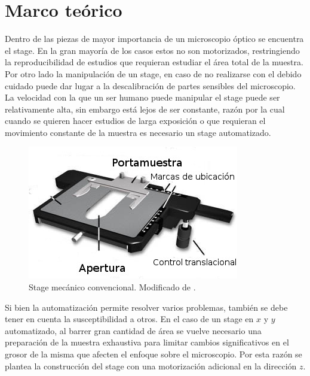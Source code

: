 \section{Marco teórico}
Dentro de las piezas de mayor importancia de un microscopio óptico se encuentra el stage. En la gran mayoría de los casos estos no son motorizados, restringiendo la reproducibilidad de estudios que requieran estudiar el área total de la muestra. Por otro lado la manipulación de un stage, en caso de no realizarse con el debido cuidado puede dar lugar a la descalibración de partes sensibles del microscopio. La velocidad con la que un ser humano puede manipular el stage puede ser relativamente alta, sin embargo está lejos de ser constante, razón por la cual cuando se quieren hacer estudios de larga exposición o que requieran el movimiento constante de la muestra es necesario un stage automatizado.
\begin{figure}[h]
	\centering
	\includegraphics[width=0.5\linewidth]{figures/stage1.jpg}
	\caption{Stage mecánico convencional. Modificado de \cite{Abramowitz2015}.}
\end{figure}

Si bien la automatización permite resolver varios problemas, también se debe tener en cuenta la susceptibilidad a otros. En el caso de un stage en $x$ y $y$ automatizado, al barrer gran cantidad de área se vuelve necesario una preparación de la muestra exhaustiva para limitar cambios significativos en el grosor de la misma que afecten el enfoque sobre el microscopio. Por esta razón se plantea la construcción del stage con una motorización adicional en la dirección $z$.


